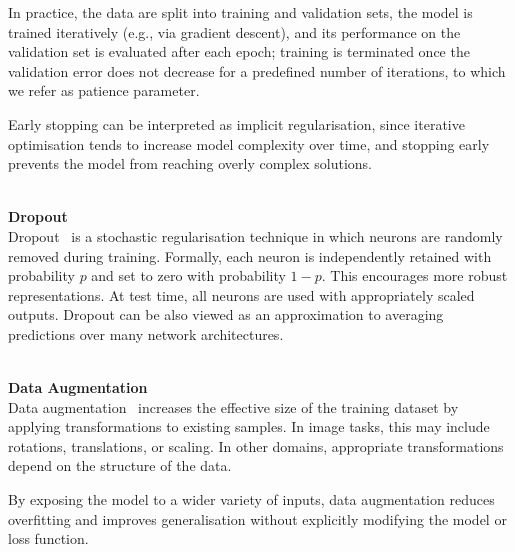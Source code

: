 In practice, the data are split into training and validation sets, the model is trained iteratively (e.g., via gradient descent), and its performance on the validation set is evaluated after each epoch; training is terminated once the validation error does not decrease for a predefined number of iterations, to which we refer as patience parameter.

Early stopping can be interpreted as implicit regularisation, since iterative optimisation tends to increase model complexity over time, and stopping early prevents the model from reaching overly complex solutions.

\textbf{\\Dropout\\}
Dropout~\cite{aggarwal2018} is a stochastic regularisation technique in which neurons are randomly removed during training. Formally, each neuron is independently retained with probability $p$ and set to zero with probability $1-p$. This encourages more robust representations. At test time, all neurons are used with appropriately scaled outputs. Dropout can be also viewed as an approximation to averaging predictions over many network architectures.

\textbf{\\Data Augmentation\\}
Data augmentation~\cite{goodfellow2016} increases the effective size of the training dataset by applying transformations to existing samples. In image tasks, this may include rotations, translations, or scaling. In other domains, appropriate transformations depend on the structure of the data.

By exposing the model to a wider variety of inputs, data augmentation reduces overfitting and improves generalisation without explicitly modifying the model or loss function.